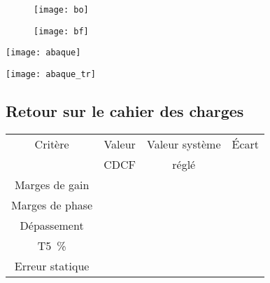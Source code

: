 \ifprof
\else

\begin{figure}[H]
\texttt{[image: bo]}
\end{figure}

\begin{figure}[H]
\texttt{[image: bf]}
\end{figure}

\begin{marginfigure}
\texttt{[image: abaque]}
\end{marginfigure}

\begin{marginfigure}
\texttt{[image: abaque\_tr]}
\end{marginfigure}

\fi

\subsection*{Retour sur le cahier des charges}

\ifprof
\else
\footnotesize
\begin{center}
\begin{tabular}{|c|c|c|c|}
\hline
Critère & Valeur & Valeur système & Écart \\ 
 &  CDCF & réglé &  \\ \hline
Marges de gain &  &&\\ \hline
Marges de phase &  &&\\ \hline
Dépassement &  &&\\ \hline
T5~\% & && \\ \hline
Erreur statique &&& \\ \hline
\end{tabular}
\end{center}
\normalsize 
\fi

\ifprof

